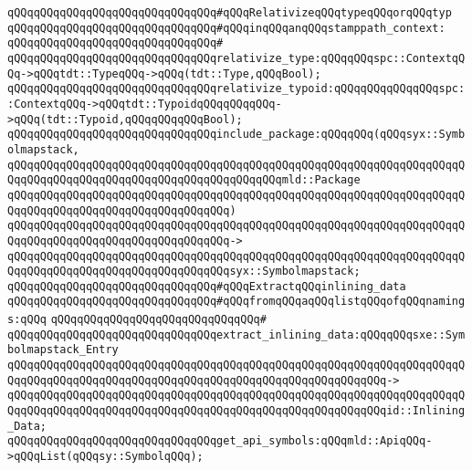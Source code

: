 \newline
\verb|qQQqqQQqqQQqqQQqqQQqqQQqqQQqqQQq#qQQqRelativizeqQQqtypeqQQqorqQQqtyp|\newline
\verb|qQQqqQQqqQQqqQQqqQQqqQQqqQQqqQQq#qQQqinqQQqanqQQqstamppath_context:|\newline
\verb|qQQqqQQqqQQqqQQqqQQqqQQqqQQqqQQq#|\newline
\verb|qQQqqQQqqQQqqQQqqQQqqQQqqQQqqQQqrelativize_type:qQQqqQQqspc::ContextqQQq->qQQqtdt::TypeqQQq->qQQq(tdt::Type,qQQqBool);|\newline
\verb|qQQqqQQqqQQqqQQqqQQqqQQqqQQqqQQqrelativize_typoid:qQQqqQQqqQQqqQQqspc::ContextqQQq->qQQqtdt::TypoidqQQqqQQqqQQq->qQQq(tdt::Typoid,qQQqqQQqqQQqBool);|\newline
\newline
\verb|qQQqqQQqqQQqqQQqqQQqqQQqqQQqqQQqinclude_package:qQQqqQQq(qQQqsyx::Symbolmapstack,|\newline
\verb|qQQqqQQqqQQqqQQqqQQqqQQqqQQqqQQqqQQqqQQqqQQqqQQqqQQqqQQqqQQqqQQqqQQqqQQqqQQqqQQqqQQqqQQqqQQqqQQqqQQqqQQqqQQqqQQqmld::Package|\newline
\verb|qQQqqQQqqQQqqQQqqQQqqQQqqQQqqQQqqQQqqQQqqQQqqQQqqQQqqQQqqQQqqQQqqQQqqQQqqQQqqQQqqQQqqQQqqQQqqQQqqQQqqQQq)|\newline
\verb|qQQqqQQqqQQqqQQqqQQqqQQqqQQqqQQqqQQqqQQqqQQqqQQqqQQqqQQqqQQqqQQqqQQqqQQqqQQqqQQqqQQqqQQqqQQqqQQqqQQqqQQq->|\newline
\verb|qQQqqQQqqQQqqQQqqQQqqQQqqQQqqQQqqQQqqQQqqQQqqQQqqQQqqQQqqQQqqQQqqQQqqQQqqQQqqQQqqQQqqQQqqQQqqQQqqQQqqQQqsyx::Symbolmapstack;|\newline
\newline
\verb|qQQqqQQqqQQqqQQqqQQqqQQqqQQqqQQq#qQQqExtractqQQqinlining_data|\newline
\verb|qQQqqQQqqQQqqQQqqQQqqQQqqQQqqQQq#qQQqfromqQQqaqQQqlistqQQqofqQQqnamings:qQQq|\newline
\verb|qQQqqQQqqQQqqQQqqQQqqQQqqQQqqQQq#|\newline
\verb|qQQqqQQqqQQqqQQqqQQqqQQqqQQqqQQqextract_inlining_data:qQQqqQQqsxe::Symbolmapstack_Entry|\newline
\verb|qQQqqQQqqQQqqQQqqQQqqQQqqQQqqQQqqQQqqQQqqQQqqQQqqQQqqQQqqQQqqQQqqQQqqQQqqQQqqQQqqQQqqQQqqQQqqQQqqQQqqQQqqQQqqQQqqQQqqQQqqQQqqQQq->|\newline
\verb|qQQqqQQqqQQqqQQqqQQqqQQqqQQqqQQqqQQqqQQqqQQqqQQqqQQqqQQqqQQqqQQqqQQqqQQqqQQqqQQqqQQqqQQqqQQqqQQqqQQqqQQqqQQqqQQqqQQqqQQqqQQqqQQqid::Inlining_Data;|\newline
\newline
\verb|qQQqqQQqqQQqqQQqqQQqqQQqqQQqqQQqget_api_symbols:qQQqmld::ApiqQQq->qQQqList(qQQqsy::SymbolqQQq);|\newline
